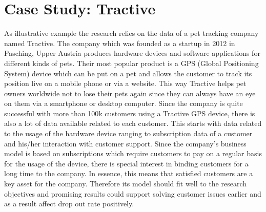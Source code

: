 \section{Case Study: Tractive}
\label{sec:illustrationExample}
As illustrative example the research relies on the data of a pet tracking company named Tractive. The company which was founded as a startup in 2012 in Pasching, Upper Austria produces hardware devices and software applications for different kinds of pets. Their most popular product is a GPS (Global Positioning System) device which can be put on a pet and allows the customer to track its position live on a mobile phone or via a website. This way Tractive helps pet owners worldwide not to lose their pets again since they can always have an eye on them via a smartphone or desktop computer. Since the company is quite successful with more than 100k customers using a Tractive GPS device, there is also a lot of data available related to each customer. This starts with data related to the usage of the hardware device ranging to subscription data of a customer and his/her interaction with customer support. Since the company's business model is based on subscriptions which require customers to pay on a regular basis for the usage of the device, there is special interest in binding customers for a long time to the company. In essence, this means that satisfied customers are a key asset for the company. Therefore its model should fit well to the research objectives and promising results could support solving customer issues earlier and as a result affect drop out rate positively. 

